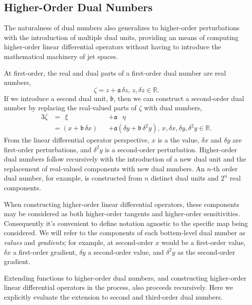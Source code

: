 \subsection{Higher-Order Dual Numbers}

The naturalness of dual numbers also generalizes to higher-order perturbations
with the introduction of multiple dual units, providing an means of computing
higher-order linear differential operators without having to introduce the mathematical
machinery of jet spaces.

At first-order, the real and dual parts of a first-order dual number are real numbers,
%
\begin{equation*}
\zeta = z + \mathfrak{a} \, \delta z, \, z, \delta z \in \mathbb{R}.
\end{equation*}
%
If we introduce a second dual unit, $\mathfrak{b}$, then we can construct a second-order 
dual number by replacing the real-valued parts of $\zeta$ with dual numbers,
%
\begin{alignat*}{3}
\zeta
&=
\;\, \xi
&&+ \mathfrak{a} \;\;\, \eta
\\
&=
\left( x + \mathfrak{b} \, \delta x \right)
&&+ \mathfrak{a} \left( \delta y + \mathfrak{b} \, \delta^{2} y \right), 
\, x, \delta x, \delta y, \delta^{2} y \in \mathbb{R}.
\end{alignat*}
%
From the linear differential operator perspective, $x$ is a the value, $\delta x$ and 
$\delta y$ are first-order perturbations, and $\delta^{2} y$ is a second-order perturbation.
Higher-order dual numbers follow recursively with the introduction of a new dual unit
and the replacement of real-valued components with new dual numbers.  An $n$-th 
order dual number, for example, is constructed from $n$ distinct dual units and
$2^{n}$ real components.

When constructing higher-order linear differential operators, these components may 
be considered as both higher-order tangents and higher-order sensitivities. Consequently 
it's convenient to define notation agnostic to the specific map being considered.
We will refer to the components of each bottem-level dual number as \textit{values} and
\textit{gradients}; for example, at second-order $x$ would be a first-order value, $\delta x$ 
a first-order gradient, $\delta y$ a second-order value, and $\delta^{2} y$ as the second-order 
gradient.

Extending functions to higher-order dual numbers, and constructing higher-order
linear differential operators in the process, also proceeds recursively.  Here we
explicitly evaluate the extension to second and third-order dual numbers.

